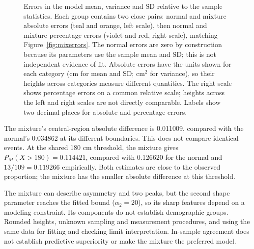 \documentclass[10pt,a4paper]{article}
\begin{document}
\begin{figure}[htbp]
\caption{Errors in the model mean, variance and SD relative to the sample
statistics. Each group contains two close pairs: normal and mixture absolute
errors (teal and orange, left scale), then normal and mixture percentage
errors (violet and red, right scale), matching Figure~\ref{fig:mixerrors}.
The normal errors are zero by construction because its parameters use the
sample mean and SD; this is not independent evidence of fit.
Absolute errors have the units shown for each category (cm for mean and SD;
$\mathrm{cm}^2$ for variance), so their heights across categories measure
different quantities. The right scale shows percentage errors on a common
relative scale; heights across the left and right scales are not directly
comparable. Labels show two decimal places for absolute and
percentage errors.}
\label{fig:mixmomenterrors}
\end{figure}


The mixture's central-region absolute difference is 0.011009, compared
with the normal's 0.034862 at its different boundaries. This does not
compare identical events. At the shared 180 cm threshold, the mixture
gives $P_M(X>180)=0.114421$, compared with 0.126620 for
the normal and $13/109=0.119266$ empirically. Both estimates are close
to the observed proportion; the mixture has the smaller absolute difference
at this threshold.

The mixture can describe asymmetry and two peaks, but the second shape
parameter reaches the fitted bound ($\alpha_2=20$), so its sharp features
depend on a modeling constraint. Its components do not establish demographic
groups. Rounded heights, unknown sampling and measurement procedures,
and using the same data for fitting and checking limit interpretation.
In-sample agreement does not establish predictive superiority or make
the mixture the preferred model.
\end{document}
